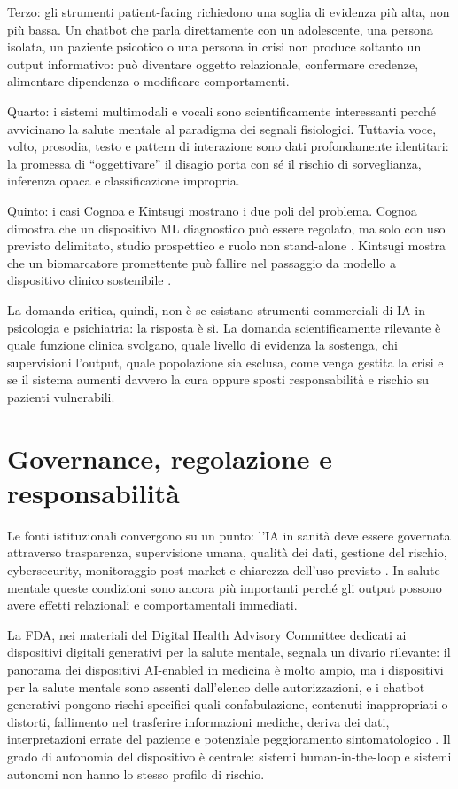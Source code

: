 \documentclass[11pt,a4paper]{article}
\begin{document}
Terzo: gli strumenti patient-facing richiedono una soglia di evidenza più alta, non più bassa. Un chatbot che parla direttamente con un adolescente, una persona isolata, un paziente psicotico o una persona in crisi non produce soltanto un output informativo: può diventare oggetto relazionale, confermare credenze, alimentare dipendenza o modificare comportamenti.

Quarto: i sistemi multimodali e vocali sono scientificamente interessanti perché avvicinano la salute mentale al paradigma dei segnali fisiologici. Tuttavia voce, volto, prosodia, testo e pattern di interazione sono dati profondamente identitari: la promessa di ``oggettivare'' il disagio porta con sé il rischio di sorveglianza, inferenza opaca e classificazione impropria.

Quinto: i casi Cognoa e Kintsugi mostrano i due poli del problema. Cognoa dimostra che un dispositivo ML diagnostico può essere regolato, ma solo con uso previsto delimitato, studio prospettico e ruolo non stand-alone \cite{fda-cognoa}. Kintsugi mostra che un biomarcatore promettente può fallire nel passaggio da modello a dispositivo clinico sostenibile \cite{verge2026}.

La domanda critica, quindi, non è se esistano strumenti commerciali di IA in psicologia e psichiatria: la risposta è sì. La domanda scientificamente rilevante è quale funzione clinica svolgano, quale livello di evidenza la sostenga, chi supervisioni l'output, quale popolazione sia esclusa, come venga gestita la crisi e se il sistema aumenti davvero la cura oppure sposti responsabilità e rischio su pazienti vulnerabili.

\section{Governance, regolazione e responsabilità}
\label{sec:governance}

Le fonti istituzionali convergono su un punto: l'IA in sanità deve essere governata attraverso trasparenza, supervisione umana, qualità dei dati, gestione del rischio, cybersecurity, monitoraggio post-market e chiarezza dell'uso previsto \cite{who2024,euai,apa}. In salute mentale queste condizioni sono ancora più importanti perché gli output possono avere effetti relazionali e comportamentali immediati.

La FDA, nei materiali del Digital Health Advisory Committee dedicati ai dispositivi digitali generativi per la salute mentale, segnala un divario rilevante: il panorama dei dispositivi AI-enabled in medicina è molto ampio, ma i dispositivi per la salute mentale sono assenti dall'elenco delle autorizzazioni, e i chatbot generativi pongono rischi specifici quali confabulazione, contenuti inappropriati o distorti, fallimento nel trasferire informazioni mediche, deriva dei dati, interpretazioni errate del paziente e potenziale peggioramento sintomatologico \cite{fda-dhac,fda-aiml}. Il grado di autonomia del dispositivo è centrale: sistemi human-in-the-loop e sistemi autonomi non hanno lo stesso profilo di rischio.
\end{document}
